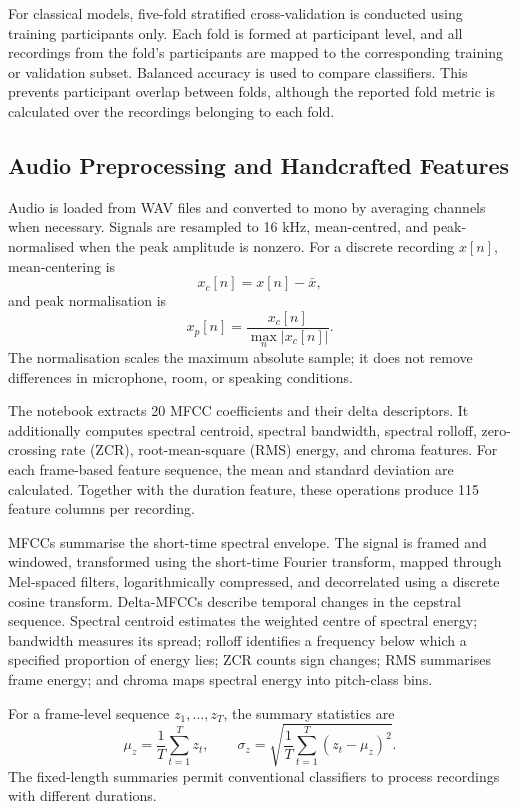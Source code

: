 \documentclass[conference]{IEEEtran}
\begin{document}
For classical models, five-fold stratified cross-validation is conducted using training participants only. Each fold is formed at participant level, and all recordings from the fold's participants are mapped to the corresponding training or validation subset. Balanced accuracy is used to compare classifiers. This prevents participant overlap between folds, although the reported fold metric is calculated over the recordings belonging to each fold.

\subsection{Audio Preprocessing and Handcrafted Features}
Audio is loaded from WAV files and converted to mono by averaging channels when necessary. Signals are resampled to 16 kHz, mean-centred, and peak-normalised when the peak amplitude is nonzero. For a discrete recording $x[n]$, mean-centering is
\begin{equation}
x_c[n]=x[n]-\bar{x},
\end{equation}
and peak normalisation is
\begin{equation}
x_p[n]=\frac{x_c[n]}{\max_n |x_c[n]|}.
\end{equation}
The normalisation scales the maximum absolute sample; it does not remove differences in microphone, room, or speaking conditions.

The notebook extracts 20 MFCC coefficients and their delta descriptors. It additionally computes spectral centroid, spectral bandwidth, spectral rolloff, zero-crossing rate (ZCR), root-mean-square (RMS) energy, and chroma features. For each frame-based feature sequence, the mean and standard deviation are calculated. Together with the duration feature, these operations produce 115 feature columns per recording.

MFCCs summarise the short-time spectral envelope. The signal is framed and windowed, transformed using the short-time Fourier transform, mapped through Mel-spaced filters, logarithmically compressed, and decorrelated using a discrete cosine transform. Delta-MFCCs describe temporal changes in the cepstral sequence. Spectral centroid estimates the weighted centre of spectral energy; bandwidth measures its spread; rolloff identifies a frequency below which a specified proportion of energy lies; ZCR counts sign changes; RMS summarises frame energy; and chroma maps spectral energy into pitch-class bins.

For a frame-level sequence $z_1,\ldots,z_T$, the summary statistics are
\begin{equation}
\mu_z=\frac{1}{T}\sum_{t=1}^{T}z_t,\qquad
\sigma_z=\sqrt{\frac{1}{T}\sum_{t=1}^{T}(z_t-\mu_z)^2}.
\end{equation}
The fixed-length summaries permit conventional classifiers to process recordings with different durations.
\end{document}
